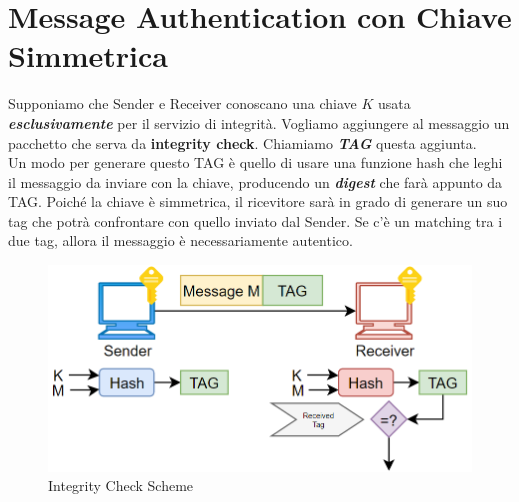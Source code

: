 \section{Message Authentication con Chiave Simmetrica}
Supponiamo che Sender e Receiver conoscano una chiave $K$ usata \textbf{\textit{esclusivamente}} per il servizio di integrità. Vogliamo aggiungere al messaggio un pacchetto che serva da \textbf{integrity check}. Chiamiamo \textbf{\textit{TAG}} questa aggiunta.\\
Un modo per generare questo TAG è quello di usare una funzione hash che leghi il messaggio da inviare con la chiave, producendo un \textbf{\textit{digest}} che farà appunto da TAG. Poiché la chiave è simmetrica, il ricevitore sarà in grado di generare un suo tag che potrà confrontare con quello inviato dal Sender. Se c'è un matching tra i due tag, allora il messaggio è necessariamente autentico. 
\begin{figure}[H]
    \centering
    \includegraphics[width=\linewidth]{image/integrityscheme.png}
    \caption{Integrity Check Scheme}
    \label{fig:intcheck}
\end{figure}
